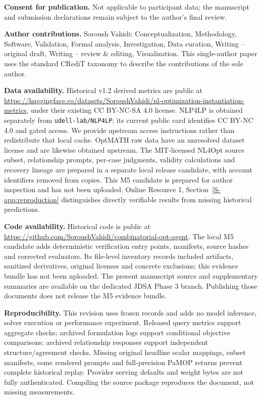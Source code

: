 \documentclass[pdflatex,iicol,sn-basic,Numbered]{sn-jnl}
\begin{document}
\noindent\textbf{Consent for publication.} Not applicable to participant data; the manuscript and submission declarations remain subject to the author's final review.

\noindent\textbf{Author contributions.} Soroush Vahidi: Conceptualization, Methodology, Software, Validation, Formal analysis, Investigation, Data curation, Writing -- original draft, Writing -- review \& editing, Visualization. This single-author paper uses the standard CRediT taxonomy to describe the contributions of the sole author.

\noindent\textbf{Data availability.} Historical v1.2 derived metrics are public at \url{https://huggingface.co/datasets/SoroushVahidi/nl-optimization-instantiation-metrics}, under their existing CC BY-NC-SA 4.0 license. NLP4LP is obtained separately from \texttt{udell-lab/NLP4LP}; its current public card identifies CC BY-NC 4.0 and gated access. We provide upstream access instructions rather than redistribute that local cache. OptMATH raw data have an unresolved dataset license and are likewise obtained upstream. The MIT-licensed NL4Opt source subset, relationship prompts, per-case judgments, validity calculations and recovery lineage are prepared in a separate local release candidate, with account identifiers removed from copies. This M5 candidate is prepared for author inspection and has not been uploaded. Online Resource 1, Section~\ref{S-app:reproduction} distinguishes directly verifiable results from missing historical predictions.

\noindent\textbf{Code availability.} Historical code is public at \url{https://github.com/SoroushVahidi/combinatorial-opt-agent}. The local M5 candidate adds deterministic verification entry points, manifests, source hashes and corrected evaluators. Its file-level inventory records included artifacts, sanitized derivatives, original licenses and concrete exclusions; this evidence bundle has not been uploaded. The present manuscript source and supplementary summaries are available on the dedicated JDSA Phase 3 branch. Publishing those documents does not release the M5 evidence bundle.

\noindent\textbf{Reproducibility.} This revision uses frozen records and adds no model inference, solver execution or performance experiment. Released query metrics support aggregate checks; archived formulation logs support conditional objective comparisons; archived relationship responses support independent structure/agreement checks. Missing original headline scalar mappings, subset manifests, some rendered prompts and full-precision PaMOP returns prevent complete historical replay. Provider serving defaults and weight bytes are not fully authenticated. Compiling the source package reproduces the document, not missing measurements.
\end{document}
